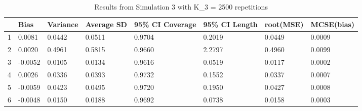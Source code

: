 \begin{table}[ht]
\centering
\begin{tabular}{rlllllll}
  \hline
 & Bias & Variance & Average SD & 95\% CI Coverage & 95\% CI Length & root(MSE) & MCSE(bias) \\ 
  \hline
1 & 0.0081 & 0.0442 & 0.0511 & 0.9704 & 0.2019 & 0.0449 & 0.0009 \\ 
  2 & 0.0020 & 0.4961 & 0.5815 & 0.9660 & 2.2797 & 0.4960 & 0.0099 \\ 
  3 & -0.0052 & 0.0105 & 0.0134 & 0.9616 & 0.0519 & 0.0117 & 0.0002 \\ 
  4 & 0.0026 & 0.0336 & 0.0393 & 0.9732 & 0.1552 & 0.0337 & 0.0007 \\ 
  5 & -0.0059 & 0.0423 & 0.0495 & 0.9720 & 0.1950 & 0.0427 & 0.0008 \\ 
  6 & -0.0048 & 0.0150 & 0.0188 & 0.9692 & 0.0738 & 0.0158 & 0.0003 \\ 
   \hline
\end{tabular}
\caption{Results from Simulation 3 with K_3 = 2500 repetitions} 
\end{table}
